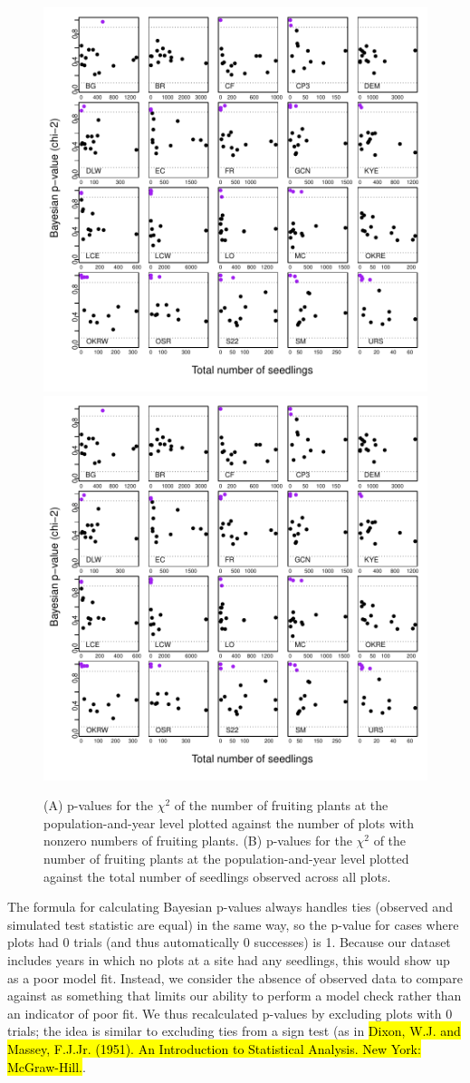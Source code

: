 \documentclass[12pt, oneside, titlepage]{article}   	%
\begin{document}
\begin{figure}[!h]
   \centering
       \includegraphics[page=1,width=.45\textwidth]{../../figures/modelChecks/seedlingSurvivalFruiting-populationyear.pdf}  
       \includegraphics[page=2,width=.45\textwidth]{../../figures/modelChecks/seedlingSurvivalFruiting-populationyear.pdf}  
    \caption{ (A) p-values for the $\chi^2$ of the number of fruiting plants at the population-and-year level plotted against the number of plots with nonzero numbers of fruiting plants. (B) p-values for the $\chi^2$ of the number of fruiting plants at the population-and-year level plotted against the total number of seedlings observed across all plots.  }
 \label{fig:name}
\end{figure}

The formula for calculating Bayesian p-values always handles ties (observed and simulated test statistic are equal) in the same way, so the p-value for cases where plots had 0 trials (and thus automatically 0 successes) is 1. Because our dataset includes years in which no plots at a site had any seedlings, this would show up as a poor model fit. Instead, we consider the absence of observed data to compare against as something that limits our ability to perform a model check rather than an indicator of poor fit. We thus recalculated p-values by excluding plots with 0 trials; the idea is similar to excluding ties from a sign test (as in \hl{Dixon, W.J. and Massey, F.J.Jr. (1951). An Introduction to Statistical Analysis. New York: McGraw-Hill.}.
\end{document}
